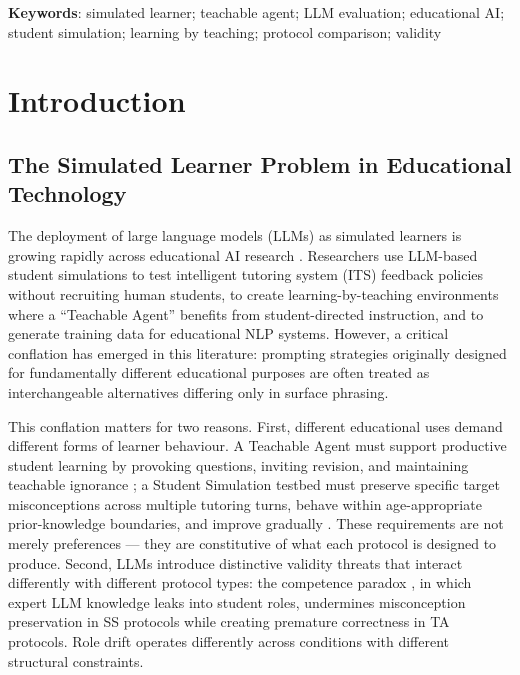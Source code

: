 \documentclass[12pt]{article}
\begin{document}
\textbf{Keywords}: simulated learner; teachable agent; LLM evaluation; educational AI;
student simulation; learning by teaching; protocol comparison; validity

\section{Introduction}

\subsection{The Simulated Learner Problem in Educational Technology}

The deployment of large language models (LLMs) as simulated learners is growing rapidly
across educational AI research \citep{yuan2026, mannekote2025, embracing2025}.
Researchers use LLM-based student simulations to test intelligent tutoring system (ITS)
feedback policies without recruiting human students, to create learning-by-teaching
environments where a ``Teachable Agent'' benefits from student-directed instruction, and
to generate training data for educational NLP systems.
However, a critical conflation has emerged in this literature: prompting strategies
originally designed for fundamentally different educational purposes are often treated
as interchangeable alternatives differing only in surface phrasing.

This conflation matters for two reasons.
First, different educational uses demand different forms of learner behaviour.
A Teachable Agent must support productive student learning by provoking questions,
inviting revision, and maintaining teachable ignorance \citep{blair2007};
a Student Simulation testbed must preserve specific target misconceptions across
multiple tutoring turns, behave within age-appropriate prior-knowledge boundaries,
and improve gradually \citep{koedinger2015}.
These requirements are not merely preferences --- they are constitutive of what each
protocol is designed to produce.
Second, LLMs introduce distinctive validity threats that interact differently with
different protocol types: the competence paradox \citep{yuan2026}, in which expert
LLM knowledge leaks into student roles, undermines misconception preservation in SS
protocols while creating premature correctness in TA protocols.
Role drift \citep{mannekote2025, bea2025_teacher} operates differently across
conditions with different structural constraints.
\end{document}
